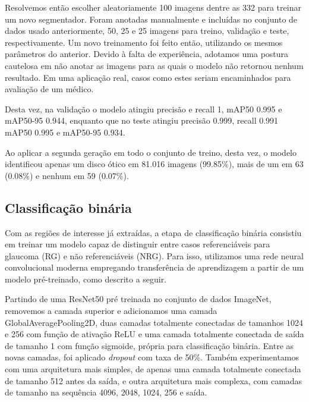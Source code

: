 \documentclass[12pt]{article}
\begin{document}
Resolvemos então escolher aleatoriamente 100 imagens dentre as 332 para treinar um novo segmentador. Foram anotadas manualmente e incluídas no conjunto de dados usado anteriormente, 50, 25 e 25 imagens para treino, validação e teste, respectivamente. Um novo treinamento foi feito então, utilizando os mesmos parâmetros do anterior. Devido à falta de experiência, adotamos uma postura cautelosa em não anotar as imagens para as quais o modelo não retornou nenhum resultado. Em uma aplicação real, casos como estes seriam encaminhados para avaliação de um médico. 

Desta vez, na validação o modelo atingiu precisão e recall 1, mAP50 0.995 e mAP50-95 0.944, enquanto que no teste atingiu precisão 0.999, recall 0.991 mAP50 0.995 e mAP50-95 0.934.

Ao aplicar a segunda geração em todo o conjunto de treino, desta vez, o modelo identificou apenas um disco ótico em 81.016 imagens (99.85\%), mais de um em 63 (0.08\%) e nenhum em 59 (0.07\%).






\subsection{Classificação binária}
\label{sec:binary_classification}

Com as regiões de interesse já extraídas, a etapa de classificação binária consistiu em treinar um modelo capaz de distinguir entre casos referenciáveis para glaucoma (RG) e não referenciáveis (NRG). Para isso, utilizamos uma rede neural convolucional moderna empregando transferência de aprendizagem a partir de um modelo pré-treinado, como descrito a seguir.

Partindo de uma ResNet50 pré treinada no conjunto de dados ImageNet, removemos a camada superior e adicionamos uma camada GlobalAveragePooling2D, duas camadas totalmente conectadas de tamanhos 1024 e 256 com função de ativação ReLU e uma camada totalmente conectada de saída de tamanho 1 com função sigmoide, própria para classificação binária. Entre as novas camadas, foi aplicado \emph{dropout} com taxa de 50\%. Também experimentamos com uma arquitetura mais simples, de apenas uma camada totalmente conectada de tamanho 512 antes da saída, e outra arquitetura mais complexa, com camadas de tamanho na sequência 4096, 2048, 1024, 256 e saída.
\end{document}
